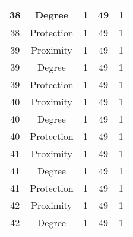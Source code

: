 \documentclass[results.tex]{subfiles}
\begin{document}
\begin{center}
\begin{tabular}{| c || c | c | c | c |}
            \hline
            38                      & Degree                       & 1                      & 49                      & 1                    \\
            \hline
            38                      & Protection                   & 1                      & 49                      & 1                    \\
            \hline
            39                      & Proximity                    & 1                      & 49                      & 1                    \\
            \hline
            39                      & Degree                       & 1                      & 49                      & 1                    \\
            \hline
            39                      & Protection                   & 1                      & 49                      & 1                    \\
            \hline
            40                      & Proximity                    & 1                      & 49                      & 1                    \\
            \hline
            40                      & Degree                       & 1                      & 49                      & 1                    \\
            \hline
            40                      & Protection                   & 1                      & 49                      & 1                    \\
            \hline
            41                      & Proximity                    & 1                      & 49                      & 1                    \\
            \hline
            41                      & Degree                       & 1                      & 49                      & 1                    \\
            \hline
            41                      & Protection                   & 1                      & 49                      & 1                    \\
            \hline
            42                      & Proximity                    & 1                      & 49                      & 1                    \\
            \hline
            42                      & Degree                       & 1                      & 49                      & 1                    \\

\end{tabular}
\end{center}
\end{document}
